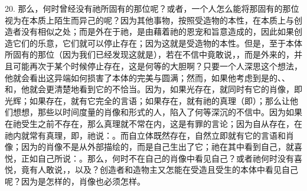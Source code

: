 20. 那么，何时曾经没有祂所固有的那位呢？或者，一个人怎么能将那固有的那位视为在本质上陌生而异己的呢？因为其他事物，按照受造物的本性，在本质上与创造者没有相似之处；而是外在于祂，是由藉着祂的恩宠和旨意造成的，因此如果创造它们的乐意，它们就可以停止存在；因为这就是受造物的本性。但是，至于本体所固有的那位（因为我们已经发现这就是），若在不信中竟敢说，，而是外来的，并且可能再次于某个时候停止存在，这是何等的大胆啊？只要一个人深思这个想法，他就会看出这异端如何损害了本体的完美与圆满；然而，如果他考虑到是的、、和，他就会更清楚地看到它的不恰当。因为，如果光存在，就同时有它的肖像，即光辉；如果存在，就有它完全的言语；如果存在，就有祂的真理（即）；那么让他们想想，那些以时间度量的肖像和形式的人，陷入了何等深沉的不信中。因为如果在祂受生之前不存在，那么真理就不常在内，这是有罪的言论；因为自从存在，在祂内就常有真理，即，祂说：。而自立体既然存在，自然立即就有它的言语和肖像；因为的肖像不是从外部描绘的，而是自己生出了它；祂在其中看到自己，就喜悦，正如自己所说：。那么，何时不在自己的肖像中看见自己？或者祂何时没有喜悦，竟有人敢说，，以及？创造者和造物主又怎能在受造且受生的本体中看见自己呢？因为是怎样的，肖像也必须怎样。\par

